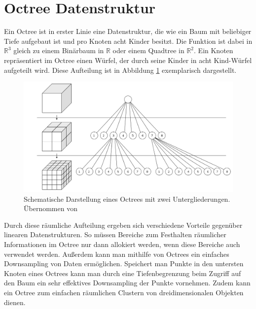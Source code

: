 \section{Octree Datenstruktur}

Ein Octree ist in erster Linie eine Datenstruktur, die wie ein Baum mit beliebiger Tiefe aufgebaut ist und pro Knoten acht Kinder besitzt. Die Funktion ist dabei in \(\mathbb{R}^3\) gleich zu einem Binärbaum in \(\mathbb{R}\) oder einem Quadtree in \(\mathbb{R}^2\). Ein Knoten repräsentiert im Octree einen Würfel, der durch seine Kinder in acht Kind-Würfel aufgeteilt wird. Diese Aufteilung ist in Abbildung \ref{fig:octree} exemplarisch dargestellt.

\begin{figure}[h]
  \centering
	\includegraphics[width=1.0\textwidth]{content/images/theory/octree.png} 
  \caption{Schematische Darstellung eines Octrees mit zwei Untergliederungen. Übernommen von \citet{dumusc2011multi}}
  \label{fig:octree}
\end{figure}

Durch diese räumliche Aufteilung ergeben sich verschiedene Vorteile gegenüber linearen Datenstrukturen. So müssen Bereiche zum Festhalten räumlicher Informationen im Octree nur dann allokiert werden, wenn diese Bereiche auch verwendet werden. Außerdem kann man mithilfe von Octrees ein einfaches Downsampling von Daten ermöglichen. Speichert man Punkte in den untersten Knoten eines Octrees kann man durch eine Tiefenbegrenzung beim Zugriff auf den Baum ein sehr effektives Downsampling der Punkte vornehmen. Zudem kann ein Octree zum einfachen räumlichen Clustern von dreidimensionalen Objekten dienen.
